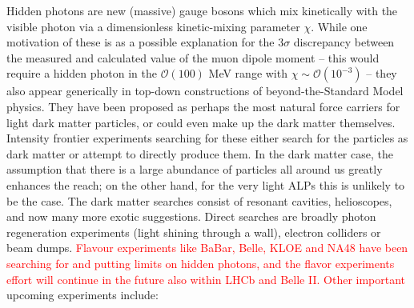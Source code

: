 Hidden photons are new (massive) gauge bosons which mix kinetically with the visible photon via a dimensionless kinetic-mixing parameter $\chi$. While one motivation of these is as a possible explanation for the $3\sigma$ discrepancy between the measured and calculated value of the muon dipole moment -- this would require a hidden photon in the $\mathcal{O}(100)$ MeV range with $\chi \sim \mathcal{O}(10^{-3})$ -- they also appear generically in top-down constructions of beyond-the-Standard Model physics. They have been proposed as perhaps the most natural force carriers for light dark matter particles, or could even make up the dark matter themselves. Intensity frontier experiments searching for these either search for the particles as dark matter or attempt to directly produce them. In the dark matter case, the assumption that there is a large abundance of particles all around us greatly enhances the reach; on the other hand, for the very light ALPs this is unlikely to be the case. The dark matter searches consist of resonant cavities, helioscopes, and now many more exotic suggestions. Direct searches are broadly photon regeneration experiments (light shining through a wall), electron colliders or beam dumps. \textcolor{red}{Flavour experiments like BaBar, Belle, KLOE and NA48 have been searching for and putting limits on hidden photons, and the flavor experiments effort will continue in the future also within LHCb and Belle II. Other important } upcoming experiments include:
